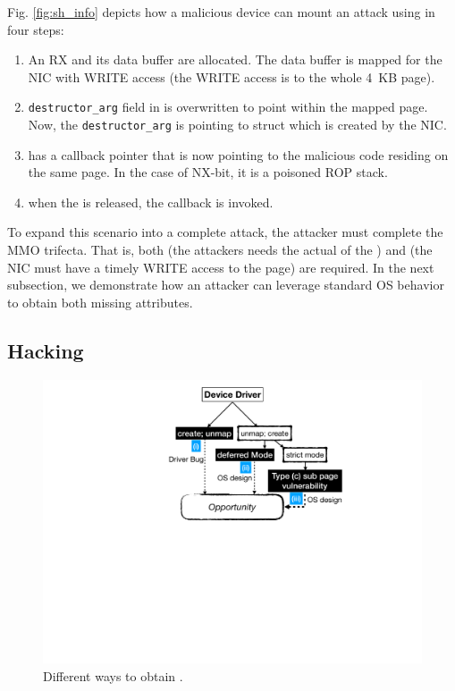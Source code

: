 Fig. \ref{fig:sh_info} depicts how a malicious device can mount an attack using \shinfo{} in four steps:
\begin{enumerate}[label=(\alph*)]
    \item An RX \skb{} and its data buffer are allocated. The data buffer is mapped for the NIC with WRITE access (the WRITE access is to the whole 4~KB page). 
    \item \texttt{destructor\_arg} field in \shinfo{} is overwritten to point within the mapped page. Now, the \texttt{destructor\_arg} is pointing to struct \uarg{} which is created by the NIC.
    \item \uarg{} has a callback pointer that is now pointing to the malicious code residing on the same page. In the case of NX-bit, it is a poisoned ROP stack.
    \item when the \skb{} is released, the callback is invoked.
\end{enumerate}
To expand this scenario into a complete attack, the attacker must complete the MMO trifecta. That is, both \means{} (the attackers needs the actual \kva{} of the \mabaf{}) and \oportunity{} (the NIC must have a timely WRITE access to the page) are required. In the next subsection, we demonstrate how an attacker can leverage standard OS behavior to obtain both missing attributes.

\subsection{Hacking~\oportunity{}}\label{sec:shinfo}

\begin{figure}[t]
    \centering
    \includegraphics[width=\linewidth]{figs/road_to_op.pdf}
    \caption{Different ways to obtain \oportunity.}
    \label{fig:road_to_op}
\end{figure}

